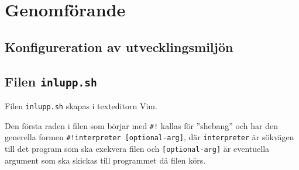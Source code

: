 %


\section{Genomförande}


\subsection{Konfigureration av utvecklingsmiljön}
% 
%   
%



\subsection{Filen \texttt{inlupp.sh}}
Filen \texttt{inlupp.sh} skapas i texteditorn Vim.



Den första raden i filen som börjar med \texttt{\#!}\cite{wiki:shebang}  kallas
för ''shebang'' och har den generella formen \texttt{#!interpreter
[optional-arg]}, där \texttt{interpreter} är sökvägen till det program som ska
exekvera filen och \texttt{[optional-arg]} är eventuella argument som ska
skickas till programmet då filen körs.




